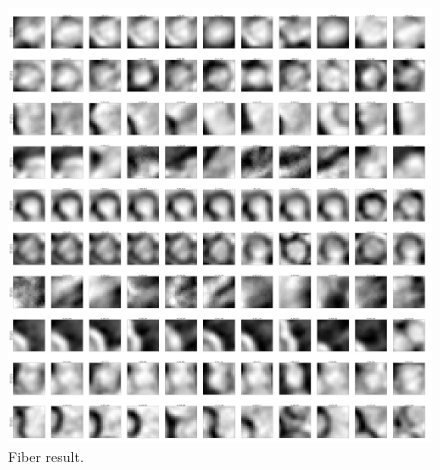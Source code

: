 \begin{figure}[h]
\centering
\includegraphics[width=\linewidth]{img/fiberResult.png}
\caption{Fiber result.}
\label{fig:fiberResult}
\end{figure}
